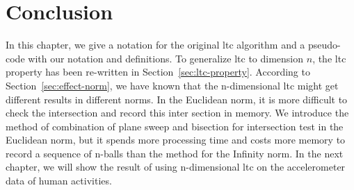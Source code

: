 \section{Conclusion}
In this chapter, we give a notation for the original \acrshort{ltc} algorithm
and a pseudo-code with our notation and definitions. To generalize
\acrshort{ltc} to dimension $n$, the \acrshort{ltc} property has been re-written
in Section~\ref{sec:ltc-property}. According to Section~\ref{sec:effect-norm},
we have known that the n-dimensional \acrshort{ltc} might get different results
in different norms. In the Euclidean norm, it is more difficult to check the
intersection and record this inter section in memory. We introduce the method of
combination of plane sweep and bisection for intersection test in the Euclidean
norm, but it spends more processing time and costs more memory to record a
sequence of n-balls than the method for the Infinity norm. In the next chapter,
we will show the result of using n-dimensional \acrshort{ltc} on the
accelerometer data of human activities. 

